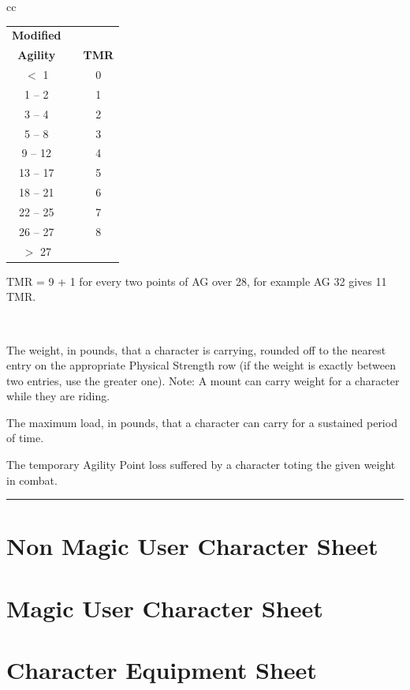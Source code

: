 \documentclass[twoside,a4paper]{article}
\begin{document}
\begin{tabular}[t]{cc}
\begin{minipage}[t]{2.5in}
\begin{tabularx}{2.5in}[t]{cXc}
\textbf{Modified} & \\
\textbf{Agility} & & \textbf{TMR} \\ \hline
 $<$ 1		& & 0 \\ \hline
  1 -- 2	& &  1 \\ \hline
  3 -- 4	& & 2 \\ \hline
  5 -- 8	& & 3 \\ \hline
  9 -- 12	& & 4 \\ \hline
 13 -- 17	& & 5 \\ \hline
 18 -- 21	& & 6 \\ \hline
 22 -- 25	& & 7 \\ \hline
 26 -- 27	& & 8 \\ \hline
$>$ 27		& & \dag \\ \hline
\end{tabularx}

\dag TMR = 9 + 1 for every two points of AG over 28, for example AG 32 gives 11 TMR.
\end{minipage} \\
\end{tabular}

\begin{multicols}{2}

{\setlength\leftmargini{0pt}
\begin{description}
\setlength\itemsep{0pt}
\item[Weight of Load (lbs)] The weight, in pounds, that a character is
carrying, rounded off to the nearest entry on the appropriate Physical
Strength row (if the weight is exactly between two entries, use the
greater one).  Note: A mount can carry weight for a character while
they are riding.

\item[Max] The maximum load, in pounds, that a character can carry for
a sustained period of time.

\item[Agility Points Lost] The temporary Agility Point loss suffered
by a character toting the given weight in combat.

\end{description}}

\end{multicols}

\rule{\linewidth}{0.6mm}

\newpage

\section{Non Magic User Character Sheet}
\newpage

\section{Magic User Character Sheet}
\newpage

\section{Character Equipment Sheet}
\newpage
\end{document}
